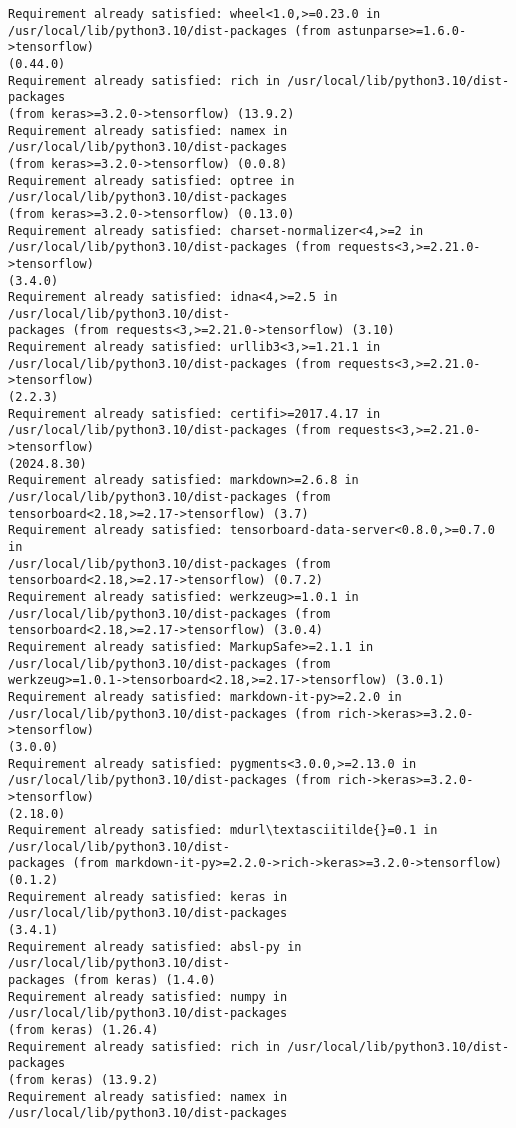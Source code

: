 \documentclass[11pt]{article}
\begin{document}
\begin{Verbatim}[commandchars=\\\{\}]
Requirement already satisfied: wheel<1.0,>=0.23.0 in
/usr/local/lib/python3.10/dist-packages (from astunparse>=1.6.0->tensorflow)
(0.44.0)
Requirement already satisfied: rich in /usr/local/lib/python3.10/dist-packages
(from keras>=3.2.0->tensorflow) (13.9.2)
Requirement already satisfied: namex in /usr/local/lib/python3.10/dist-packages
(from keras>=3.2.0->tensorflow) (0.0.8)
Requirement already satisfied: optree in /usr/local/lib/python3.10/dist-packages
(from keras>=3.2.0->tensorflow) (0.13.0)
Requirement already satisfied: charset-normalizer<4,>=2 in
/usr/local/lib/python3.10/dist-packages (from requests<3,>=2.21.0->tensorflow)
(3.4.0)
Requirement already satisfied: idna<4,>=2.5 in /usr/local/lib/python3.10/dist-
packages (from requests<3,>=2.21.0->tensorflow) (3.10)
Requirement already satisfied: urllib3<3,>=1.21.1 in
/usr/local/lib/python3.10/dist-packages (from requests<3,>=2.21.0->tensorflow)
(2.2.3)
Requirement already satisfied: certifi>=2017.4.17 in
/usr/local/lib/python3.10/dist-packages (from requests<3,>=2.21.0->tensorflow)
(2024.8.30)
Requirement already satisfied: markdown>=2.6.8 in
/usr/local/lib/python3.10/dist-packages (from
tensorboard<2.18,>=2.17->tensorflow) (3.7)
Requirement already satisfied: tensorboard-data-server<0.8.0,>=0.7.0 in
/usr/local/lib/python3.10/dist-packages (from
tensorboard<2.18,>=2.17->tensorflow) (0.7.2)
Requirement already satisfied: werkzeug>=1.0.1 in
/usr/local/lib/python3.10/dist-packages (from
tensorboard<2.18,>=2.17->tensorflow) (3.0.4)
Requirement already satisfied: MarkupSafe>=2.1.1 in
/usr/local/lib/python3.10/dist-packages (from
werkzeug>=1.0.1->tensorboard<2.18,>=2.17->tensorflow) (3.0.1)
Requirement already satisfied: markdown-it-py>=2.2.0 in
/usr/local/lib/python3.10/dist-packages (from rich->keras>=3.2.0->tensorflow)
(3.0.0)
Requirement already satisfied: pygments<3.0.0,>=2.13.0 in
/usr/local/lib/python3.10/dist-packages (from rich->keras>=3.2.0->tensorflow)
(2.18.0)
Requirement already satisfied: mdurl\textasciitilde{}=0.1 in /usr/local/lib/python3.10/dist-
packages (from markdown-it-py>=2.2.0->rich->keras>=3.2.0->tensorflow) (0.1.2)
Requirement already satisfied: keras in /usr/local/lib/python3.10/dist-packages
(3.4.1)
Requirement already satisfied: absl-py in /usr/local/lib/python3.10/dist-
packages (from keras) (1.4.0)
Requirement already satisfied: numpy in /usr/local/lib/python3.10/dist-packages
(from keras) (1.26.4)
Requirement already satisfied: rich in /usr/local/lib/python3.10/dist-packages
(from keras) (13.9.2)
Requirement already satisfied: namex in /usr/local/lib/python3.10/dist-packages

\end{Verbatim}
\end{document}
